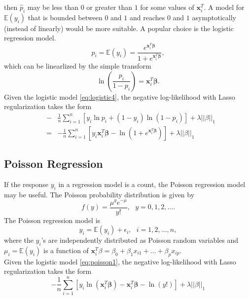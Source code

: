 \documentclass[a4paper,12pt,openany]{report}
\theoremstyle{plain}
\theoremstyle{plain}
\theoremstyle{plain}
\theoremstyle{plain}
\theoremstyle{plain}
\theoremstyle{plain}
\theoremstyle{plain}
\theoremstyle{plain}
\theoremstyle{plain}
\theoremstyle{plain}
\theoremstyle{plain}
\theoremstyle{plain}
\begin{document}
then $\hat{p}_i$ may be less than $0$ or greater than $1$ for some values of $\mathbf{x}_i^T$. A model for $\mathbb{E}(y_i)$
that is bounded between $0$ and $1$ and reaches $0$ and $1$ asymptotically (instead of
linearly) would be more suitable. A popular choice is the logistic regression model.
\begin{equation}
p_i = \mathbb{E}(y_i) = \frac{e^{\mathbf{x}_i^T\mathbf{\beta}}}{1+e^{\mathbf{x}_i^T\mathbf{\beta}}},
\end{equation}
which can be linearlized by the simple transform
\begin{equation}\label{eq:logistic4}
\ln\left(\frac{p_i}{1-p_i}\right) = \mathbf{x}_i^T\mathbf{\beta}.
\end{equation}
Given the logistic model \eqref{eq:logistic4}, the negative log-likelihood with Lasso regularization takes the form
\begin{eqnarray}
&-& \frac{1}{n}\sum_{i=1}^{n}\left[y_i\ln p_i+(1-y_i)\ln(1-p_i)\right] +\lambda||\beta||_1\\
 &=& -\frac{1}{n}\sum_{i=1}^{n}\left[y_i\mathbf{x}_i^T\mathbf{\beta}-\ln\left(1+e^{\mathbf{x}_i^T\mathbf{\beta}}\right)\right] +\lambda||\beta||_1
\end{eqnarray}
\subsection{Poisson Regression}
If the response $y_i$ in a regression model is a count, the Poisson regression model may
be useful. The Poisson probability distribution is given by
\begin{equation}\label{eq:poisson1}
f(y)=\frac{\mu^ye^{-\mu}}{y!},\ \ \  y=0,1,2,\ldots.
\end{equation}
The Poisson regression model is
\begin{equation}
y_i = \mathbb{E}(y_i)+\epsilon_{i}, \ \ \ i=1,2,\ldots,n,
\end{equation}
where the $y_i$'s are independently distributed as Poisson random variables and $\mu_i = \mathbb{E}(y_i)$ is a function of $\mathbf{x}_i^T\beta = \beta_0 +\beta_1x_{i1}+\ldots+\beta_px_{ip}$.\\
 Given the logistic model \eqref{eq:poisson1}, the negative log-likelihood with Lasso regularization takes the form
 \begin{equation}
 -\frac{1}{n}\sum_{i=1}^{n}\left[y_i\ln\left(\mathbf{x}_i^T\mathbf{\beta}\right)-\mathbf{x}_i^T\mathbf{\beta}-\ln\left(y!\right)\right] +\lambda||\beta||_1
 \end{equation}
\end{document}
